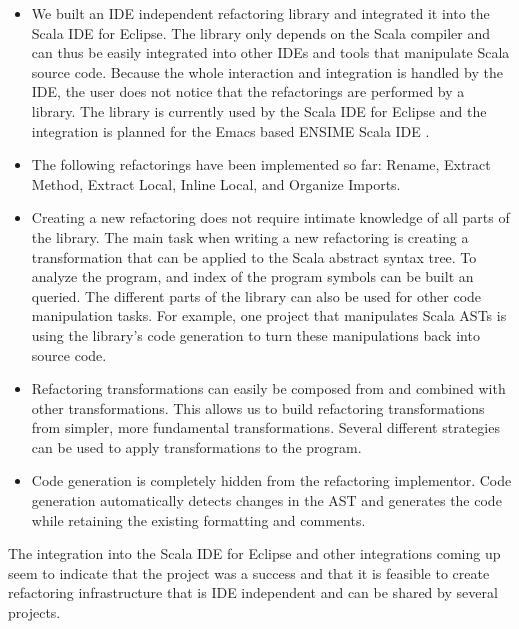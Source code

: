 \documentclass[10pt,a4paper,oneside]{scrreprt}
\begin{document}
\begin{itemize}
  \item We built an IDE independent refactoring library and integrated it into the Scala IDE for Eclipse. The library only depends on the Scala compiler and can thus be easily integrated into other IDEs and tools that manipulate Scala source code. Because the whole interaction and integration is handled by the IDE, the user does not notice that the refactorings are performed by a library. The library is currently used by the Scala IDE for Eclipse \cite{EclipseScalaIDE} and the integration is planned for the Emacs based ENSIME Scala IDE \cite{Ensime}.

  \item The following refactorings have been implemented so far: Rename, Extract Method, Extract Local, Inline Local, and Organize Imports.

  \item Creating a new refactoring does not require intimate knowledge of all parts of the library. The main task when writing a new refactoring is creating a transformation that can be applied to the Scala abstract syntax tree. To analyze the program, and index of the program symbols can be built an queried. The different parts of the library can also be used for other code manipulation tasks. For example, one project \cite{RichardEmberson} that manipulates Scala ASTs  is using the library's code generation to turn these manipulations back into source code.

  \item Refactoring transformations can easily be composed from and combined with other transformations. This allows us to build refactoring transformations from simpler, more fundamental transformations. Several different strategies can be used to apply transformations to the program.

  \item Code generation is completely hidden from the refactoring implementor. Code generation automatically detects changes in the AST and generates the code while retaining the existing formatting and comments.

\end{itemize}

The integration into the Scala IDE for Eclipse and other integrations coming up seem to indicate that the project was a success and that it is feasible to create refactoring infrastructure that is IDE independent and can be shared by several projects.
\end{document}
